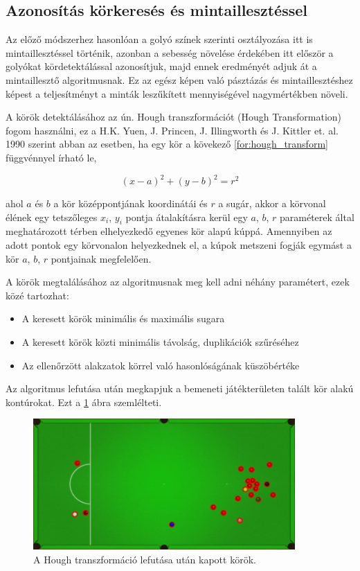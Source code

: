 \subsection{Azonosítás körkeresés és mintaillesztéssel}
Az előző módszerhez hasonlóan a golyó színek szerinti osztályozása itt is mintaillesztéssel történik, azonban a sebesség növelése érdekében itt először a golyókat kördetektálással azonosítjuk, majd ennek eredményét adjuk át a mintaillesztő algoritmusnak. Ez az egész képen való pásztázás és mintaillesztéshez képest a teljesítményt a minták leszűkített mennyiségével nagymértékben növeli.

\par A körök detektálásához az ún. Hough transzformációt (Hough Transformation) fogom használni, ez a H.K. Yuen, J. Princen, J. Illingworth és J. Kittler et. al. 1990 \cite{YUEN199071} szerint abban az esetben, ha egy kör a kövekező \ref{for:hough_transform} függvénnyel írható le,

\begin{equation}
    (x - a)^2 + (y - b)^2 = r^2
    \label{for:hough_transform}
\end{equation}

\par ahol $a$ és $b$ a kör középpontjának koordinátái és $r$ a sugár, akkor a körvonal élének egy tetszőleges $x_i$, $y_i$ pontja átalakításra kerül egy $a$, $b$, $r$ paraméterek által meghatározott térben elhelyezkedő egyenes kör alapú kúppá.\cite{hough_transform,YUEN199071} Amennyiben az adott pontok egy körvonalon helyezkednek el, a kúpok metszeni fogják egymást a kör $a$, $b$, $r$ pontjainak megfelelően.\cite{YUEN199071}
\par A körök megtalálásához az algoritmusnak meg kell adni néhány paramétert, ezek közé tartozhat:
\begin{itemize}
    \setlength\itemsep{-2pt}
    \item A keresett körök minimális és maximális sugara
    \item A keresett körök közti minimális távolság, duplikációk szűréséhez
    \item Az ellenőrzött alakzatok körrel való hasonlóságának küszöbértéke
\end{itemize}
\par Az algoritmus lefutása után megkapjuk a bemeneti játékterületen talált kör alakú kontúrokat. Ezt a \ref{fig:talalt_korok} ábra szemlélteti.

\begin{figure}[!ht]
    \centering
    \includegraphics[width=100mm, keepaspectratio]{figures/detected_circles.png}
    \caption{A Hough transzformáció lefutása után kapott körök.}
    \label{fig:talalt_korok}
\end{figure}

